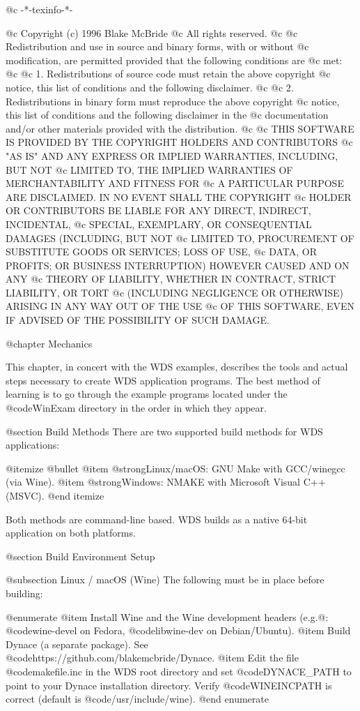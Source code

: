 @c -*-texinfo-*-

@c  Copyright (c) 1996 Blake McBride
@c  All rights reserved.
@c
@c  Redistribution and use in source and binary forms, with or without
@c  modification, are permitted provided that the following conditions are
@c  met:
@c
@c  1. Redistributions of source code must retain the above copyright
@c  notice, this list of conditions and the following disclaimer.
@c
@c  2. Redistributions in binary form must reproduce the above copyright
@c  notice, this list of conditions and the following disclaimer in the
@c  documentation and/or other materials provided with the distribution.
@c
@c  THIS SOFTWARE IS PROVIDED BY THE COPYRIGHT HOLDERS AND CONTRIBUTORS
@c  "AS IS" AND ANY EXPRESS OR IMPLIED WARRANTIES, INCLUDING, BUT NOT
@c  LIMITED TO, THE IMPLIED WARRANTIES OF MERCHANTABILITY AND FITNESS FOR
@c  A PARTICULAR PURPOSE ARE DISCLAIMED. IN NO EVENT SHALL THE COPYRIGHT
@c  HOLDER OR CONTRIBUTORS BE LIABLE FOR ANY DIRECT, INDIRECT, INCIDENTAL,
@c  SPECIAL, EXEMPLARY, OR CONSEQUENTIAL DAMAGES (INCLUDING, BUT NOT
@c  LIMITED TO, PROCUREMENT OF SUBSTITUTE GOODS OR SERVICES; LOSS OF USE,
@c  DATA, OR PROFITS; OR BUSINESS INTERRUPTION) HOWEVER CAUSED AND ON ANY
@c  THEORY OF LIABILITY, WHETHER IN CONTRACT, STRICT LIABILITY, OR TORT
@c  (INCLUDING NEGLIGENCE OR OTHERWISE) ARISING IN ANY WAY OUT OF THE USE
@c  OF THIS SOFTWARE, EVEN IF ADVISED OF THE POSSIBILITY OF SUCH DAMAGE.

@chapter Mechanics

This chapter, in concert with the WDS examples, describes the tools and
actual steps necessary to create WDS application programs.  The best
method of learning is to go through the example programs located under
the @code{WinExam} directory in the order in which they appear.

@section Build Methods
There are two supported build methods for WDS applications:

@itemize @bullet
@item
@strong{Linux/macOS:} GNU Make with GCC/winegcc (via Wine).
@item
@strong{Windows:} NMAKE with Microsoft Visual C++ (MSVC).
@end itemize

Both methods are command-line based.  WDS builds as a native 64-bit
application on both platforms.

@section Build Environment Setup

@subsection Linux / macOS (Wine)
The following must be in place before building:

@enumerate
@item
Install Wine and the Wine development headers (e.g.@: @code{wine-devel}
on Fedora, @code{libwine-dev} on Debian/Ubuntu).
@item
Build Dynace (a separate package).
See @code{https://github.com/blakemcbride/Dynace}.
@item
Edit the file @code{makefile.inc} in the WDS root directory and set
@code{DYNACE_PATH} to point to your Dynace installation directory.
Verify @code{WINEINCPATH} is correct (default is
@code{/usr/include/wine}).
@end enumerate

